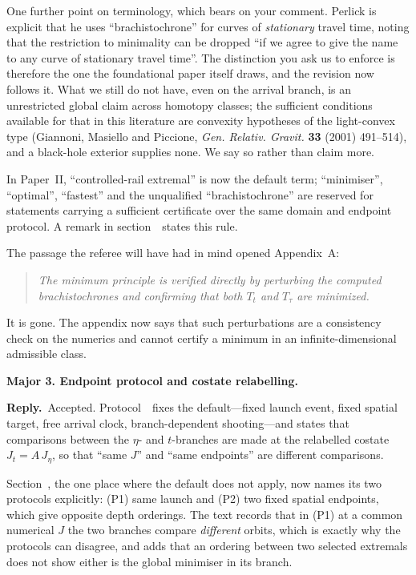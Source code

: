 \documentclass[11pt]{article}
\newenvironment{referee}
  {\begin{quote}\itshape\small}
  {\end{quote}}
\newcommand{\reply}{\par\noindent\textbf{Reply.}\ }
\newcommand{\R}[1]{\par\medskip\noindent\textbf{#1}\par\nopagebreak}
\begin{document}
One further point on terminology, which bears on your comment. Perlick is
explicit that he uses ``brachistochrone'' for curves of \emph{stationary} travel
time, noting that the restriction to minimality can be dropped ``if we agree to
give the name to any curve of stationary travel time''. The distinction you ask
us to enforce is therefore the one the foundational paper itself draws, and the
revision now follows it. What we still do not have, even on
the arrival branch, is an unrestricted global claim across homotopy classes;
the sufficient conditions available for that in this literature are convexity
hypotheses of the light-convex type (Giannoni, Masiello and Piccione, \emph{Gen. Relativ. Gravit.} \textbf{33} (2001) 491--514), and a
black-hole exterior supplies none. We say so rather than claim more.

In Paper~II, ``controlled-rail extremal'' is now the default term; ``minimiser'',
``optimal'', ``fastest'' and the unqualified ``brachistochrone'' are reserved for
statements carrying a sufficient certificate over the same domain and endpoint
protocol. A remark in section~\msSecDomain\ states this rule.

The passage the referee will have had in mind opened Appendix~A:

\begin{referee}
The minimum principle is verified directly by perturbing the computed
brachistochrones and confirming that both $T_t$ and $T_\tau$ are minimized.
\end{referee}

\noindent It is gone. The appendix now says that such perturbations are a
consistency check on the numerics and cannot certify a minimum in an
infinite-dimensional admissible class.

\R{Major 3. Endpoint protocol and costate relabelling.}

\reply Accepted. Protocol~\msProtEndpoint\ fixes the default---fixed launch event, fixed
spatial target, free arrival clock, branch-dependent shooting---and states that
comparisons between the $\eta$- and $t$-branches are made at the relabelled
costate $J_t=A\,J_\eta$, so that ``same $J$'' and ``same endpoints'' are
different comparisons.

Section~\msSecBvp, the one place where the default does not apply, now names its two
protocols explicitly: (P1) same launch and (P2) two fixed spatial endpoints,
which give opposite depth orderings. The text records that in (P1) at a common
numerical $J$ the two branches compare \emph{different} orbits, which is exactly
why the protocols can disagree, and adds that an ordering between two selected
extremals does not show either is the global minimiser in its branch.
\end{document}
